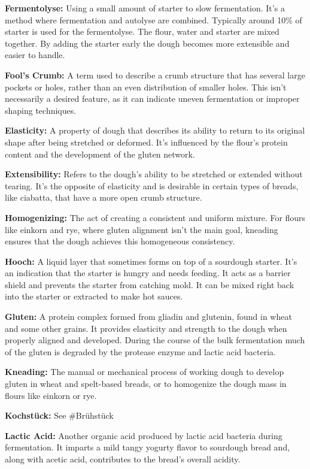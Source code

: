 \textbf{Fermentolyse:} Using a small amount of starter to slow fermentation.
It's a method where fermentation and autolyse are combined. Typically around 10\%
of starter is used for the fermentolyse. The flour, water and starter are mixed
together. By adding the starter early the dough becomes more extensible and easier
to handle.

\textbf{Fool’s Crumb:} A term used to describe a crumb structure that has several
large pockets or holes, rather than an even distribution of smaller holes. This
isn't necessarily a desired feature, as it can indicate uneven fermentation or
improper shaping techniques.

\textbf{Elasticity:} A property of dough that describes its ability to return to
its original shape after being stretched or deformed. It's influenced by the flour's
protein content and the development of the gluten network.

\textbf{Extensibility:} Refers to the dough’s ability to be stretched or extended
without tearing. It's the opposite of elasticity and is desirable in certain types
of breads, like ciabatta, that have a more open crumb structure.

\textbf{Homogenizing:} The act of creating a consistent and uniform mixture. For
flours like einkorn and rye, where gluten alignment isn't the main goal, kneading
ensures that the dough achieves this homogeneous consistency.

\textbf{Hooch:} A liquid layer that sometimes forms on top of a sourdough starter.
It's an indication that the starter is hungry and needs feeding. It acts as a
barrier shield and prevents the starter from catching mold. It can be mixed right
back into the starter or extracted to make hot sauces.

\textbf{Gluten:} A protein complex formed from gliadin and glutenin, found in wheat
and some other grains. It provides elasticity and strength to the dough when
properly aligned and developed. During the course of the bulk fermentation much of
the gluten is degraded by the protease enzyme and lactic acid bacteria.

\textbf{Kneading:} The manual or mechanical process of working dough to develop gluten
in wheat and spelt-based breads, or to homogenize the dough mass in flours like
einkorn or rye.

\textbf{Kochstück:} See \#Brühstück

\textbf{Lactic Acid:} Another organic acid produced by lactic acid bacteria during
fermentation. It imparts a mild tangy yogurty flavor to sourdough bread and, along
with acetic acid, contributes to the bread's overall acidity.

